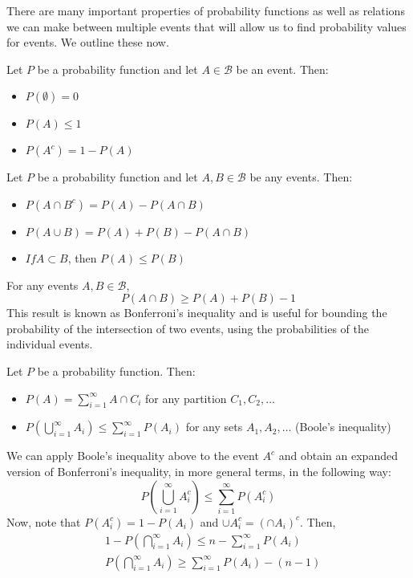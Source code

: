 There are many important properties of probability functions as well as relations we can make between multiple events that will allow us to find probability values for events. We outline these now.

\begin{theorem}
    Let $P$ be a probability function and let $A \in \mathcal{B}$ be an event. Then:
    \begin{itemize}
        \item $P(\emptyset) = 0$
        \item $P(A) \leq 1$
        \item $P(A^c) = 1 - P(A)$
    \end{itemize}
\end{theorem}

\begin{theorem}
    Let $P$ be a probability function and let $A, B \in \mathcal{B}$ be any events. Then:
    \begin{itemize}
        \item $P(A \cap B^c) = P(A) - P(A \cap B)$
        \item $P(A \cup B) = P(A) + P(B) - P(A \cap B)$
        \item $If A\subset B$, then $P(A) \leq P(B)$
    \end{itemize}
\end{theorem}

\begin{corollary}
    For any events $A, B \in \mathcal{B}$, 
    \[
    P(A \cap B) \geq P(A) + P(B) - 1
    \]
    This result is known as Bonferroni's inequality and is useful for bounding the probability of the intersection of two events, using the probabilities of the individual events.
\end{corollary}

\begin{theorem}
    Let $P$ be a probability function. Then:
    \begin{itemize}
        \item $P(A) = \sum_{i=1}^{\infty}{A \cap C_i}$ for any partition $C_1, C_2, \dots$
        \item $P\left(\bigcup_{i=1}^{\infty}{A_i}\right) \leq \sum_{i=1}^{\infty}{P(A_i)}$ for any sets $A_1, A_2, \dots$ \quad (Boole's inequality)
    \end{itemize}
\end{theorem}
\nextp

We can apply Boole's inequality above to the event $A^c$ and obtain an expanded version of Bonferroni's inequality, in more general terms, in the following way:
\[
P\left(\bigcup_{i=1}^{\infty}{A_i^c}\right) \leq \sum_{i=1}^{\infty}{P(A_i^c)}
\]
Now, note that $P(A_i^c) = 1 - P(A_i)$ and $\cup{A_i^c} = (\cap{A_i})^c$. Then, 
\begin{align}
    & 1 - P\left(\bigcap_{i=1}^{\infty}{A_i}\right) \leq n -\sum_{i=1}^{\infty}{P(A_i)} \\
    & P\left(\bigcap_{i=1}^{\infty}{A_i}\right) \geq \sum_{i=1}^{\infty}{P(A_i)} - (n - 1)
\end{align}
\nextp

